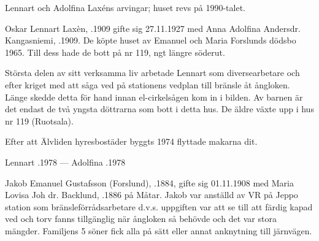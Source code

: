 Lennart och Adolfina Laxéns arvingar; huset revs på 1990-talet.\jhvspace{}



Oskar Lennart Laxèn, .1909 gifte sig 27.11.1927 med Anna Adolfina Andersdr. Kangasniemi, .1909. De köpte huset av Emanuel och Maria Forslunds dödsbo 1965. Till dess hade de bott på nr 119, ngt längre söderut.

Största delen av sitt verksamma liv arbetade Lennart som diversearbetare och efter kriget med att såga ved på stationens vedplan till bränsle åt ångloken. Länge skedde detta för hand innan el-cirkelsågen kom in i bilden. Av barnen är det endast de två yngsta döttrarna som bott i detta hus. De äldre växte upp i hus nr 119 (Ruotsala).
\begin{jhchildren}
  \item {}
  \item {}
  \item {}
  \item {}
  \item {}
  \item {}
  \item {}
\end{jhchildren}

Efter att Älvliden hyresbostäder byggts 1974 flyttade makarna dit.

Lennart .1978  ---  Adolfina .1978


Jakob Emanuel Gustafsson (Forslund), .1884, gifte sig 01.11.1908 med Maria Lovisa Joh dr. Backlund,  .1886 på Måtar. Jakob var anställd av VR på Jeppo station som bränsleförrådsarbetare d.v.s. uppgiften var att se till att färdig kapad ved och torv fanns tillgänglig när ångloken så behövde och det var stora mängder. Familjens 5 söner fick alla på sätt eller annat anknytning till järnvägen.

